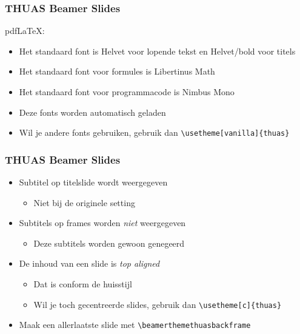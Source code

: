 \documentclass[fleqn,aspectratio=169,dutch,10pt]{beamer}
\begin{document}
\begin{frame}[fragile]
\frametitle{THUAS Beamer Slides}
pdf\LaTeX{}:
\begin{itemize}
\item Het standaard font is Helvet voor lopende tekst en Helvet/bold voor titels
\item Het standaard font voor formules is Libertinus Math
\item Het standaard font voor programmacode is Nimbus Mono
\item Deze fonts worden automatisch geladen
\item Wil je andere fonts gebruiken, gebruik dan \lstinline|\usetheme[vanilla]{thuas}|
\end{itemize}
\end{frame}


\begin{frame}[fragile]
\frametitle{THUAS Beamer Slides}
\begin{itemize}
\item Subtitel op titelslide wordt weergegeven
\begin{itemize}
\item Niet bij de originele setting
\end{itemize}
\item Subtitels op frames worden \emph{niet} weergegeven
\begin{itemize}
\item Deze subtitels worden gewoon genegeerd
\end{itemize}
\item De inhoud van een slide is \emph{top aligned}
\begin{itemize}
\item Dat is conform de huisstijl
\item Wil je toch gecentreerde slides, gebruik dan \lstinline|\usetheme[c]{thuas}|
\end{itemize}
\item Maak een allerlaatste slide met \lstinline|\beamerthemethuasbackframe|
\end{itemize}
\end{frame}
\end{document}
